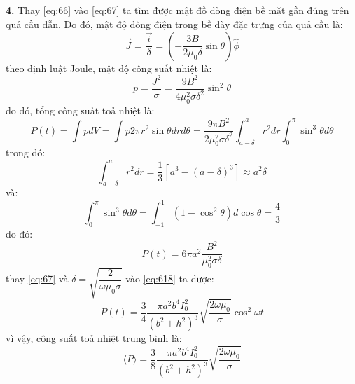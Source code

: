 \noindent\textbf{4.} Thay \eqref{eq:66} vào \eqref{eq:67} ta tìm được  mật đồ dòng điện bề mặt gần đúng trên quả cầu dẫn. Do đó, mật độ dòng điện trong bề dày đặc trưng của quả cầu là:
\begin{equation}
  \label{eq:613}
  \vec{J}=\frac{\vec{i}}{\delta}=\left(-\frac{3B}{2\mu_{0}\delta}\sin\theta\right)\hat{\phi}
\end{equation}
theo định luật Joule, mật độ công suất nhiệt là:
\begin{equation}
  \label{eq:614}
  p=\frac{J^{2}}{\sigma}=\frac{9B^{2}}{4\mu_{0}^{2}\sigma\delta^{2}}\sin^{2}\theta
\end{equation}
do đó, tổng công suất toả nhiệt là:
\begin{equation}
  \label{eq:615}
  P(t)=\int pdV=\int p 2\pi r^{2}\sin\theta drd\theta=\frac{9\pi B^{2}}{2\mu_{0}^{2}\sigma \delta^{2}}\int_{a-\delta}^{a}r^{2}dr\int_{0}^{\pi}\sin^{3}\theta d\theta
\end{equation}
trong đó:
\begin{equation}
  \label{eq:616}
  \int_{a-\delta}^{a}r^{2}dr=\frac{1}{3}[a^{3}-(a-\delta)^{3}]\approx a^{2}\delta
\end{equation}
và:
\begin{equation}
  \label{eq:617}
  \int_{0}^{\pi}\sin^{3}\theta d\theta=\int_{-1}^{1}(1-\cos^{2}\theta)d\cos\theta=\frac{4}{3}
\end{equation}
do đó:
\begin{equation}
  \label{eq:618}
  P(t)=6\pi a^{2}\frac{B^{2}}{\mu_{0}^{2}\sigma\delta}
\end{equation}
thay \eqref{eq:67} và $\delta=\sqrt{\dfrac{2}{\omega\mu_{0}\sigma}}$ vào \eqref{eq:618} ta được:
\begin{equation}
  \label{eq:619}
  P(t)=\frac{3}{4}\frac{\pi a^{2}b^{4}I_{0}^{2}}{(b^{2}+h^{2})^{3}}\sqrt{\frac{2\omega\mu_{0}}{\sigma}}\cos^{2}\omega t
\end{equation}
vì vậy, công suất toả nhiệt trung bình là:
\begin{equation}
  \label{eq:620}
  \langle P \rangle = \frac{3}{8}\frac{\pi a^{2}b^{4}I_{0}^{2}}{(b^{2}+h^{2})^{3}}\sqrt{\frac{2\omega\mu_{0}}{\sigma}}
\end{equation}

